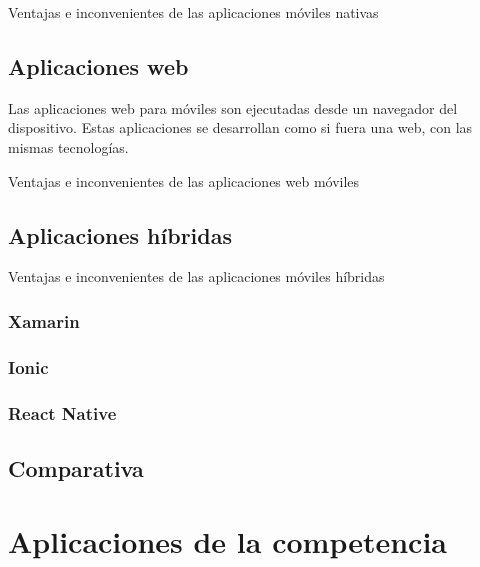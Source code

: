 \begin{table}[nativas]
	\centering
	{\small
		
	}
	\caption[Ventajas e inconvenientes de las aplicaciones móviles nativas]
	{Ventajas e inconvenientes de las aplicaciones móviles nativas~\cite{TIPAPP}}
	\label{tab:nativas}
\end{table}

\subsection{Aplicaciones web}
Las aplicaciones web para móviles son ejecutadas desde un navegador del dispositivo. Estas aplicaciones se desarrollan
como si fuera una web, con las mismas tecnologías.

\begin{table}[web]
	\centering
	{\small
		
	}
	\caption[Ventajas e inconvenientes de las aplicaciones web móviles]
	{Ventajas e inconvenientes de las aplicaciones web móviles~\cite{TIPAPP}}
	\label{tab:web}
\end{table}

\subsection{Aplicaciones híbridas}

\begin{table}[hibridas]
	\centering
	{\small
		
	}
	\caption[Ventajas e inconvenientes de las aplicaciones móviles híbridas]
	{Ventajas e inconvenientes de las aplicaciones móviles híbridas~\cite{TIPAPP}}
	\label{tab:hibridas}
\end{table}

\subsubsection{Xamarin}
\subsubsection{Ionic}
\subsubsection{React Native}

\subsection{Comparativa}


\section{Aplicaciones de la competencia}
